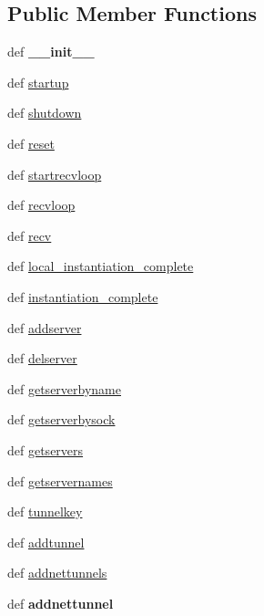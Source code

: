 \subsection*{Public Member Functions}
\begin{DoxyCompactItemize}
\item 
\hypertarget{classcore_1_1broker_1_1_core_broker_a935f310d4e45e54f59d0dfcb7805e632}{def {\bfseries \+\_\+\+\_\+init\+\_\+\+\_\+}}\label{classcore_1_1broker_1_1_core_broker_a935f310d4e45e54f59d0dfcb7805e632}

\item 
def \hyperlink{classcore_1_1broker_1_1_core_broker_ae374c068e0d1e2a0fdd02e97542efd16}{startup}
\item 
def \hyperlink{classcore_1_1broker_1_1_core_broker_a183821253455e288e4ed9be8ba4d5904}{shutdown}
\item 
def \hyperlink{classcore_1_1broker_1_1_core_broker_ae1fc05cfb6afecd8550cfe06bd6e034b}{reset}
\item 
def \hyperlink{classcore_1_1broker_1_1_core_broker_a89db0e240cc1f9870dfa54f6a8596abc}{startrecvloop}
\item 
def \hyperlink{classcore_1_1broker_1_1_core_broker_a3c11034b5f2a9c94117d7dfcd7b363af}{recvloop}
\item 
def \hyperlink{classcore_1_1broker_1_1_core_broker_ad900031736d366fcccb841aeb682f45b}{recv}
\item 
def \hyperlink{classcore_1_1broker_1_1_core_broker_a9bc2b4e24f6a971637fa7015129ccd6e}{local\+\_\+instantiation\+\_\+complete}
\item 
def \hyperlink{classcore_1_1broker_1_1_core_broker_a4beb718cd6597f4ecfed95bfc6691ea1}{instantiation\+\_\+complete}
\item 
def \hyperlink{classcore_1_1broker_1_1_core_broker_ab49a42fe492f71945c77b51d90b9796c}{addserver}
\item 
def \hyperlink{classcore_1_1broker_1_1_core_broker_afb27f84a0be44ebf4d8a6c3d0ed50f62}{delserver}
\item 
def \hyperlink{classcore_1_1broker_1_1_core_broker_aa4511f4a854b5c75e70468312f42070b}{getserverbyname}
\item 
def \hyperlink{classcore_1_1broker_1_1_core_broker_a8a3cc9cca90ece2ddeea874040837c0e}{getserverbysock}
\item 
def \hyperlink{classcore_1_1broker_1_1_core_broker_aa181fc886fa0b49f33e3183513d0a7a6}{getservers}
\item 
def \hyperlink{classcore_1_1broker_1_1_core_broker_a4546c152527cb9a528339a99d73a7ea6}{getservernames}
\item 
def \hyperlink{classcore_1_1broker_1_1_core_broker_ae87c24f64a0cb6422679ce135edd4c97}{tunnelkey}
\item 
def \hyperlink{classcore_1_1broker_1_1_core_broker_a1b855f94bef2565eb8282de25ff11122}{addtunnel}
\item 
def \hyperlink{classcore_1_1broker_1_1_core_broker_ac291295f26264962f4bdddcb9673c0d1}{addnettunnels}
\item 
\hypertarget{classcore_1_1broker_1_1_core_broker_ae8d0bd37b367284037fa39e0afb85f27}{def {\bfseries addnettunnel}}\label{classcore_1_1broker_1_1_core_broker_ae8d0bd37b367284037fa39e0afb85f27}


\end{DoxyCompactItemize}

